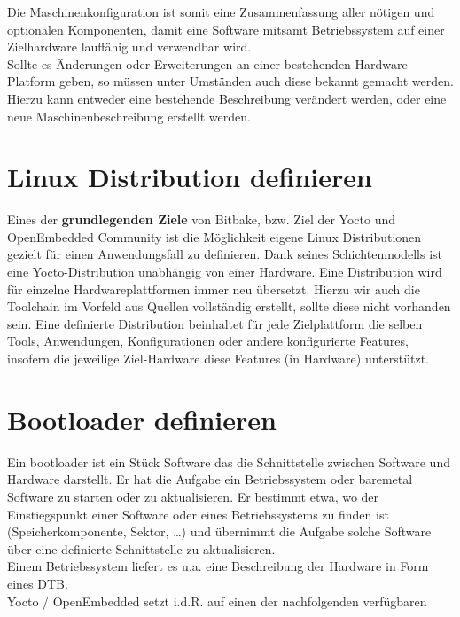 Die Maschinen\-konfiguration ist somit eine Zusammenfassung aller nötigen und
optionalen Komponenten, damit eine Software mitsamt Betriebssystem auf einer
Ziel\-hardware lauffähig und verwendbar wird.  \\

Sollte es Änderungen oder Erweiterungen an einer bestehenden Hardware-Platform
geben, so müssen unter Umständen auch diese bekannt gemacht werden. Hierzu kann
entweder eine bestehende Beschreibung verändert werden, oder eine neue
Maschinenbeschreibung erstellt werden. \cite[S.
91-95]{Gonzalez2018:Embedded_Linux_Development_Using_Yocto_Project_Cookbook_2nd}


\section{Linux Distribution definieren}%
\label{sec:linux_distribution_definieren}
Eines der \textbf{grundlegenden Ziele} von Bitbake, bzw. Ziel der Yocto und
OpenEmbedded Community ist die Möglichkeit eigene Linux Distributionen gezielt
für einen Anwendungsfall zu definieren. Dank seines Schichtenmodells ist eine
Yocto-Distribution unabhängig von einer Hardware. Eine Distribution wird für
einzelne Hardwareplattformen immer neu übersetzt. Hierzu wir auch die Toolchain
im Vorfeld aus Quellen vollständig erstellt, sollte diese nicht vorhanden sein.
Eine definierte Distribution beinhaltet für jede Zielplattform die selben
Tools, Anwendungen, Konfigurationen oder andere konfigurierte Features,
insofern die jeweilige Ziel-Hardware diese Features (in Hardware) unterstützt.



\section{Bootloader definieren}%
\label{sec:bootloader_definieren}
Ein bootloader ist ein Stück Software das die Schnittstelle zwischen Software
und Hardware darstellt. Er hat die Aufgabe ein Betriebssystem oder baremetal
Software zu starten oder zu aktualisieren. Er bestimmt etwa, wo der
Einstiegspunkt einer Software oder eines Betriebssystems zu finden ist (Speicherkomponente, Sektor, \ldots) und übernimmt die Aufgabe solche Software über eine definierte Schnittstelle zu aktualisieren.
\\
Einem Betriebssystem liefert es u.a. eine Beschreibung der Hardware in Form
eines \gls{DTB}.
\\
Yocto / OpenEmbedded setzt i.d.R. auf einen der nachfolgenden verfügbaren

